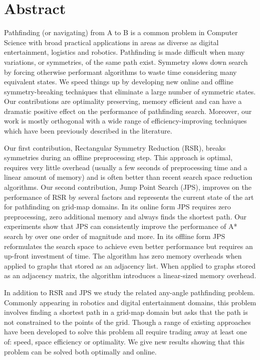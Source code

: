 \chapter*{Abstract}
\vspace{-1em}
Pathfinding (or navigating) from A to B is a common problem in Computer
Science with broad practical applications in areas as diverse as digital
entertainment, logistics and robotics.  Pathfinding is made difficult when
many variations, or symmetries, of the same path exist.  Symmetry slows down
search by forcing otherwise performant algorithms to waste time considering
many equivalent states.  We speed things up by developing new online and
offline symmetry-breaking techniques that eliminate a large number of
symmetric states. Our contributions are optimality preserving, memory
efficient and can have a dramatic positive effect on the performance of
pathfinding search. Moreover, our work is mostly orthogonal with a wide range
of efficiency-improving techniques which have been previously described in the
literature.  \par Our first contribution, Rectangular Symmetry Reduction
(RSR), breaks symmetries during an offline preprocessing step. This approach
is optimal, requires very little overhead (usually a few seconds of
preprocessing time and a linear amount of memory) and is often better than
recent search space reduction algorithms.  Our second contribution, Jump Point
Search (JPS), improves on the performance of RSR by several factors and
represents the current state of the art for pathfinding on grid-map domains.
In its online form JPS requires zero preprocessing, zero additional memory and
always finds the shortest path. Our experiments show that JPS can consistently
improve the performance of A* search by over one order of magnitude and more.
In its offline form JPS reformulates the search space to achieve even better
performance but requires an up-front investment of time. The algorithm has
zero memory overheads when applied to graphs that stored as an adjacency list.
When applied to graphs stored as an adjacency matrix, the algorithm introduces
a linear-sized memory overhead.
\par
In addition to RSR and JPS we study the related any-angle pathfinding problem.
Commonly appearing in robotics and digital entertainment domains, this problem
involves finding a shortest path in a grid-map domain but asks that the path
is not constrained to the points of the grid.  Though a range of existing
approaches have been developed to solve this problem all require trading away
at least one of: speed, space efficiency or optimality.  We give new results
showing that this problem can be solved both optimally and online.

